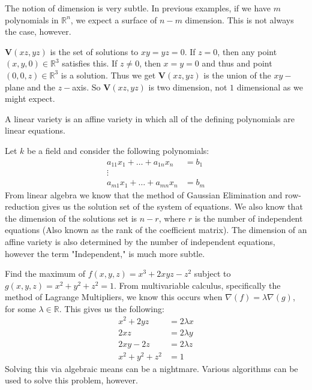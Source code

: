 \documentclass[../main.tex]{subfiles}
\begin{document}
%
The notion of dimension is very subtle. In previous examples, if we have $m$ polynomials in $\mathbb{R}^n$, we expect a surface of $n-m$ dimension. This is not always the case, however.
%
\begin{example}
$\mathbf{V}(xz,yz)$ is the set of solutions to $xy=yz = 0$. If $z = 0$, then any point $(x,y,0)\in \mathbb{R}^3$ satisfies this. If $z\ne 0$, then $x=y=0$ and thus and point $(0,0,z)\in \mathbb{R}^3$ is a solution. Thus we get $\mathbf{V}(xz,yz)$ is the union of the $xy-$plane and the $z-$axis. So $\mathbf{V}(xz,yz)$ is two dimension, not $1$ dimensional as we might expect.
\end{example}
%
\begin{definition}
A linear variety is an affine variety in which all of the defining polynomials are linear equations.
\end{definition}
%
\begin{example}
Let $k$ be a field and consider the following polynomials:
\begin{align*}
\nonumber a_{11}x_1+\hdots + a_{1n}x_n &= b_1 \\ \nonumber \vdots&  \\ \nonumber a_{m1}x_1+\hdots + a_{mn}x_n &= b_m
\end{align*}
From linear algebra we know that the method of Gaussian Elimination and row-reduction gives us the solution set of the system of equations. We also know that the dimension of the solutions set is $n-r$, where $r$ is the number of independent equations (Also known as the rank of the coefficient matrix). The dimension of an affine variety is also determined by the number of independent equations, however the term "Independent," is much more subtle.
\end{example}
%
\begin{example}
Find the maximum of $f(x,y,z) = x^3+2xyz-z^2$ subject to $g(x,y,z) = x^2+y^2+z^2=1$. From multivariable calculus, specifically the method of Lagrange Multipliers, we know this occurs when $\nabla(f) = \lambda \nabla(g)$, for some $\lambda \in \mathbb{R}$. This gives us the following:
\begin{align}
\nonumber x^2+2yz &= 2\lambda x\\
\nonumber 2xz &= 2\lambda y \\
\nonumber 2xy-2z &= 2\lambda z\\
\nonumber x^2+y^2+z^2 &= 1
\end{align}
Solving this via algebraic means can be a nightmare. Various algorithms can be used to solve this problem, however.
\end{example}
\end{document}
